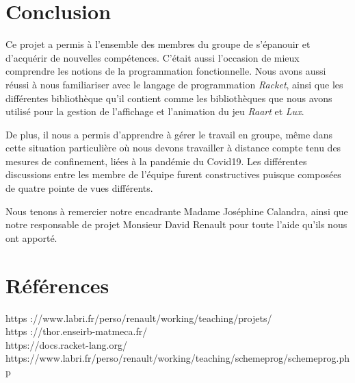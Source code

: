 \documentclass[a4paper,10pt]{article}
\begin{document}

\section{Conclusion}
Ce projet a permis à l'ensemble des membres du groupe de s'épanouir et d'acquérir de nouvelles compétences. C'était aussi l'occasion de mieux comprendre les notions de la programmation fonctionnelle. Nous avons aussi réussi à nous familiariser avec le langage de programmation \textit{Racket}, ainsi que les différentes bibliothèque qu'il contient comme les bibliothèques que nous avons utilisé pour la gestion de l'affichage et l'animation du jeu \textit{Raart} et \textit{Lux}.
\newline

De plus, il nous a permis d'apprendre à gérer le travail en groupe, même dans cette situation particulière où nous devons travailler à distance  compte tenu des mesures de confinement, liées à la pandémie du Covid19. Les différentes discussions entre les membre de l'équipe furent constructives puisque composées de quatre pointe de vues différents.
\newline

Nous tenons à remercier notre encadrante Madame Joséphine Calandra, ainsi que notre responsable de projet Monsieur David Renault pour toute l'aide qu'ils nous ont apporté.

\section{Références}
https ://www.labri.fr/perso/renault/working/teaching/projets/
\\
\indent https ://thor.enseirb-matmeca.fr/
\\
\indent https://docs.racket-lang.org/
\\
\indent https://www.labri.fr/perso/renault/working/teaching/schemeprog/schemeprog.php
\end{document}
